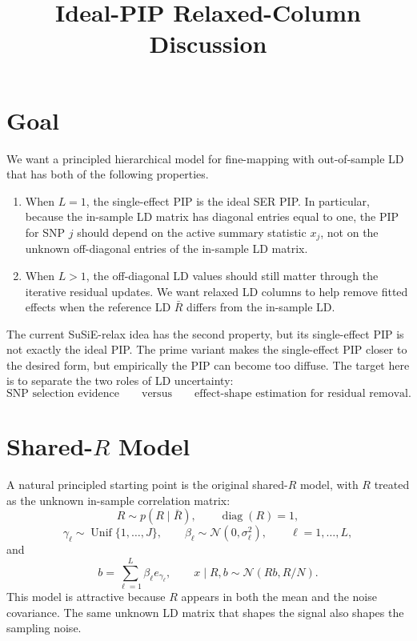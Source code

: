 \documentclass[11pt]{article}
\title{Ideal-PIP Relaxed-Column Discussion}
\author{}
\date{}
\newcommand{\Rbar}{\bar R}
\newcommand{\Normal}{\mathcal N}
\newcommand{\Unif}{\operatorname{Unif}}
\newcommand{\diag}{\operatorname{diag}}
\begin{document}
\maketitle

\section{Goal}

We want a principled hierarchical model for fine-mapping with out-of-sample
LD that has both of the following properties.
\begin{enumerate}[leftmargin=*]
\item When \(L=1\), the single-effect PIP is the ideal SER PIP. In particular,
because the in-sample LD matrix has diagonal entries equal to one, the PIP for
SNP \(j\) should depend on the active summary statistic \(x_j\), not on the
unknown off-diagonal entries of the in-sample LD matrix.
\item When \(L>1\), the off-diagonal LD values should still matter through the
iterative residual updates. We want relaxed LD columns to help remove fitted
effects when the reference LD \(\Rbar\) differs from the in-sample LD.
\end{enumerate}

The current SuSiE-relax idea has the second property, but its single-effect PIP
is not exactly the ideal PIP. The prime variant makes the single-effect PIP
closer to the desired form, but empirically the PIP can become too diffuse.
The target here is to separate the two roles of LD uncertainty:
\[
\text{SNP selection evidence}
\qquad\text{versus}\qquad
\text{effect-shape estimation for residual removal}.
\]

\section{Shared-\texorpdfstring{\(R\)}{R} Model}

A natural principled starting point is the original shared-\(R\) model, with
\(R\) treated as the unknown in-sample correlation matrix:
\[
R\sim p(R\mid \Rbar),
\qquad
\diag(R)=1,
\]
\[
\gamma_\ell\sim\Unif\{1,\ldots,J\},
\qquad
\beta_\ell\sim\Normal(0,\sigma_\ell^2),
\qquad
\ell=1,\ldots,L,
\]
and
\[
b=\sum_{\ell=1}^L\beta_\ell e_{\gamma_\ell},
\qquad
x\mid R,b
\sim
\Normal(Rb,R/N).
\]
This model is attractive because \(R\) appears in both the mean and the noise
covariance. The same unknown LD matrix that shapes the signal also shapes the
sampling noise.
\end{document}
